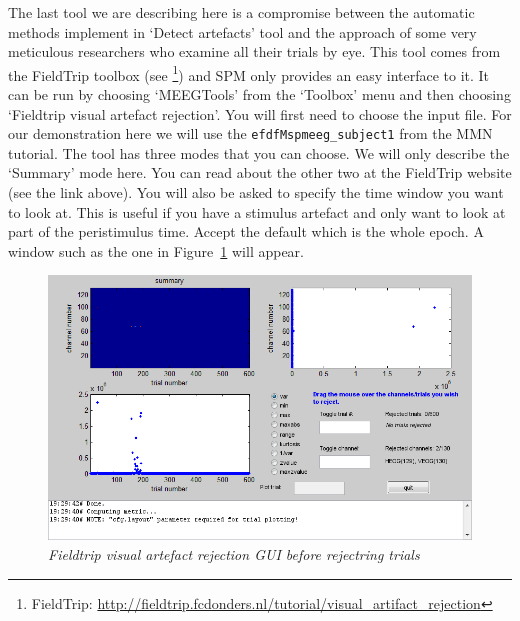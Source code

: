 The last tool we are describing here is a compromise between the automatic methods implement in `Detect artefacts' tool and the approach of some very meticulous researchers who examine all their trials by eye. This tool comes from the FieldTrip toolbox (see \footnote{FieldTrip: \url{http://fieldtrip.fcdonders.nl/tutorial/visual_artifact_rejection}}) and SPM only provides an easy interface to it. It can be run by choosing `MEEGTools' from the `Toolbox' menu and then choosing `Fieldtrip visual artefact rejection'. You will first need to choose the input file. For our demonstration here we will use the \texttt{efdfMspmeeg\_subject1} from the MMN tutorial. The tool has three modes that you can choose. We will only describe the `Summary' mode here. You can read about the other two at the FieldTrip website (see the link above). You will also be asked to specify the time window you want to look at. This is useful if you have a stimulus artefact and only want to look at part of the peristimulus time. Accept the default which is the whole epoch. A window such as the one in Figure~\ref{artefact_fig5} will appear.

 \begin{figure}
\begin{center}
\includegraphics[width=140mm]{meeg_artefact/figure5}
\caption{\em Fieldtrip visual artefact rejection GUI before rejectring trials\label{artefact_fig5}}
\end{center}
\end{figure}

